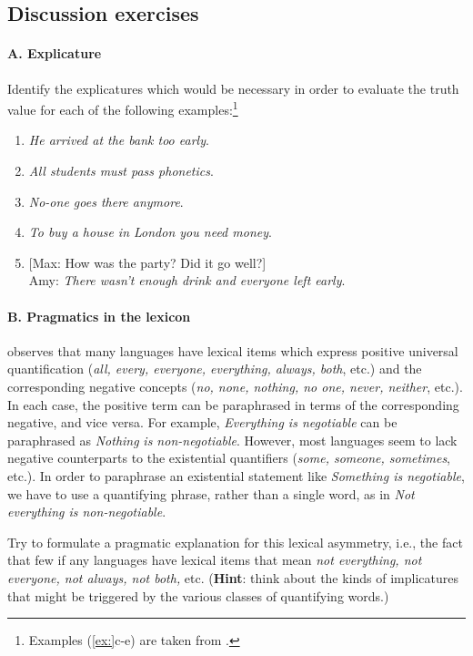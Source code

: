 \subsection*{Discussion exercises}
\paragraph*{A. Explicature}

Identify the explicatures which would be necessary in order to evaluate the truth value for each of the following examples:\footnote{Examples (\ref{ex:}c-e) are taken from \citet{CarstonHall2012}.}

\begin{enumerate}
\item \textit{He arrived at the bank too early}.
\item \textit{All students must pass phonetics}.
\item \textit{No-one goes there anymore}.
\item \textit{To buy a house in London you need money}.
\item {}[Max: How was the party? Did it go well?]\\
  Amy: \textit{There wasn’t enough drink and everyone left early}.
\end{enumerate}
\paragraph*{B. Pragmatics in the lexicon}

\citet{Horn1972} observes that many languages have lexical items which express positive universal quantification (\textit{all, every, everyone, everything, always, both}, etc.) and the corresponding negative concepts (\textit{no, none, nothing, no one, never, neither}, etc.). In each case, the positive term can be paraphrased in terms of the corresponding negative, and vice versa. For example, \textit{Everything is negotiable} can be paraphrased as \textit{Nothing} \textit{is non-negotiable}. However, most languages seem to lack negative counterparts to the existential quantifiers (\textit{some, someone, sometimes}, etc.). In order to paraphrase an existential statement like \textit{Something is negotiable}, we have to use a quantifying phrase, rather than a single word, as in \textit{Not everything is non-negotiable}.

Try to formulate a pragmatic explanation for this lexical asymmetry, i.e., the fact that few if any languages have lexical items that mean \textit{not everything, not everyone, not always, not both,} etc. (\textbf{Hint}: think about the kinds of implicatures that might be triggered by the various classes of quantifying words.)

